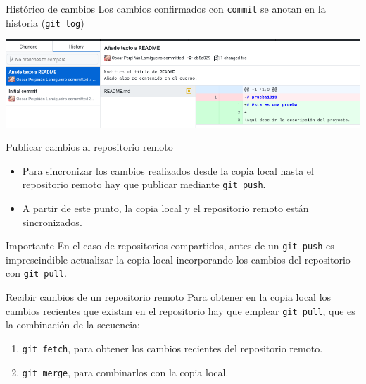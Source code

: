 \documentclass[xcolor={usenames,svgnames,dvipsnames}]{beamer}
\begin{document}
\begin{frame}[label={sec:orgfe27480},fragile]{Histórico de cambios}
 Los cambios confirmados con \texttt{commit} se anotan en la historia (\texttt{git log})

\begin{center}
\end{center}

\begin{center}
\includegraphics[width=.9\linewidth]{figs/git_history.png}
\end{center}
\end{frame}


\begin{frame}[label={sec:org911cbef},fragile]{Publicar cambios al repositorio remoto}
 \begin{itemize}
\item Para sincronizar  los cambios realizados \alert{desde la copia local hasta el repositorio remoto} hay que publicar mediante \texttt{git push}.
\end{itemize}

\begin{center}
\end{center}

\begin{itemize}
\item A partir de este punto, la copia local y el repositorio remoto están sincronizados.
\end{itemize}

\begin{block}{Importante}
En el caso de repositorios compartidos, antes de un \texttt{git push} es imprescindible actualizar la copia local incorporando los cambios del repositorio con \texttt{git pull}.
\end{block}
\end{frame}
\begin{frame}[label={sec:org3d74ab4},fragile]{Recibir cambios de un repositorio remoto}
 Para obtener en la copia local los cambios recientes que existan en el repositorio hay que emplear \texttt{git pull}, que es la combinación de la secuencia:
\begin{enumerate}
\item \texttt{git fetch}, para obtener los cambios recientes del repositorio remoto.
\item \texttt{git merge}, para combinarlos con la copia local.
\end{enumerate}

\begin{center}
\end{center}
\end{frame}
\end{document}
